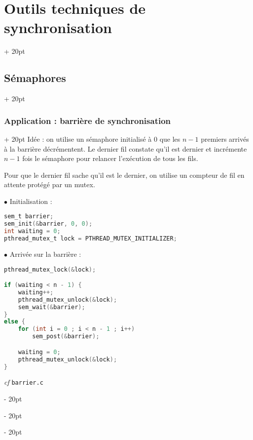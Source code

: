 \documentclass[a4paper, 12pt, twoside]{article}
\newcommand{\ind}[1][20pt]{\advance\leftskip + #1}
\newcommand{\deind}[1][20pt]{\advance\leftskip - #1}
\newenvironment{indt}[2][20pt]{#2 \par \ind[#1]}{\par \deind} %
\begin{document}
\begin{indt}{\section{Outils techniques de synchronisation}}
\begin{indt}{\subsection{Sémaphores}}
\begin{indt}{\subsubsection{Application : barrière de synchronisation}}
                Idée : on utilise un sémaphore initialisé à 0 que les $n - 1$ premiers arrivés à la barrière décrémentent. Le dernier fil constate qu'il est dernier et incrémente $n - 1$ fois le sémaphore pour relancer l'exécution de tous les fils.

                Pour que le dernier fil sache qu'il est le dernier, on utilise un compteur de fil en attente protégé par un mutex.

                \vspace{12pt}
                
                $\bullet$ Initialisation :
                \begin{lstlisting}[language=C, xleftmargin=80pt]
sem_t barrier;
sem_init(&barrier, 0, 0);
int waiting = 0;
pthread_mutex_t lock = PTHREAD_MUTEX_INITIALIZER;\end{lstlisting}

                $\bullet$ Arrivée sur la barrière :
                \begin{lstlisting}[language=C, xleftmargin=80pt]
pthread_mutex_lock(&lock);

if (waiting < n - 1) {
    waiting++;
    pthread_mutex_unlock(&lock);
    sem_wait(&barrier);
}
else {
    for (int i = 0 ; i < n - 1 ; i++)
        sem_post(&barrier);

    waiting = 0;
    pthread_mutex_unlock(&lock);
}\end{lstlisting}

                \textit{cf} \texttt{barrier.c}
            \end{indt}
        \end{indt}
    \end{indt}
    
    
    
\end{document}
